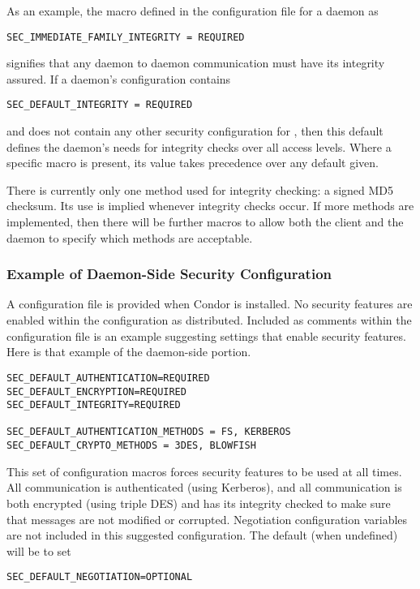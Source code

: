 As an example, the macro defined in the configuration file
for a daemon as
\begin{verbatim}
SEC_IMMEDIATE_FAMILY_INTEGRITY = REQUIRED
\end{verbatim}
signifies that any daemon to daemon communication must
have its integrity assured.
If a daemon's configuration contains
\begin{verbatim}
SEC_DEFAULT_INTEGRITY = REQUIRED
\end{verbatim}
and does not contain any other security configuration for
\verb@INTEGRITY@, then this default defines the daemon's needs
for integrity checks over all access levels.
Where a specific macro is present, its value takes
precedence over any default given.

There is currently only one method used for integrity checking:
a signed MD5 checksum.
Its use is implied whenever integrity checks occur.
If more methods are implemented, then there will be further
macros to allow both the client and the daemon to specify
which methods are acceptable.

\subsubsection{\label{sec:Security-sample1} Example of Daemon-Side Security Configuration}

A configuration file is provided when Condor is installed.
No security features are enabled within the configuration as
distributed.
Included as comments within the configuration file is an example 
suggesting settings that enable security features.
Here is that example of the daemon-side portion.

\begin{verbatim}
SEC_DEFAULT_AUTHENTICATION=REQUIRED
SEC_DEFAULT_ENCRYPTION=REQUIRED
SEC_DEFAULT_INTEGRITY=REQUIRED

SEC_DEFAULT_AUTHENTICATION_METHODS = FS, KERBEROS
SEC_DEFAULT_CRYPTO_METHODS = 3DES, BLOWFISH
\end{verbatim}

This set of configuration macros forces security features
to be used at all times.
All communication is authenticated (using Kerberos),
and all communication is both encrypted
(using triple DES)
and has its
integrity checked to make sure that messages
are not modified or corrupted.
Negotiation configuration variables are not included in this
suggested configuration.
The default (when undefined) will be to set
\begin{verbatim}
SEC_DEFAULT_NEGOTIATION=OPTIONAL
\end{verbatim}



